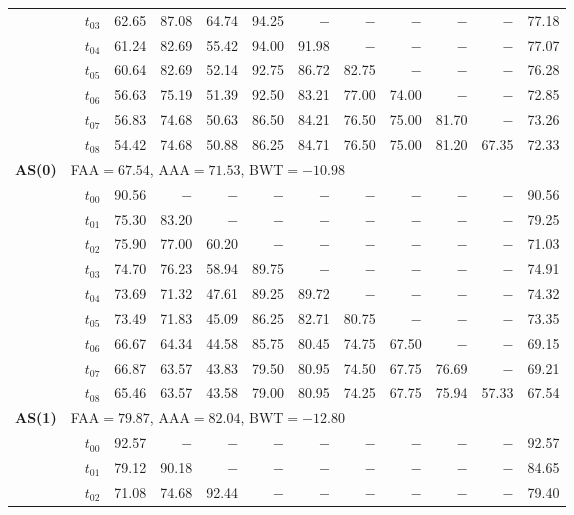 \begin{table}[ht]
\begin{tabular}{@{}l l l *{10}{r}@{}}
 & & $t_{03}$ & 62.65 & 87.08 & 64.74 & 94.25 & $-$ & $-$ & $-$ & $-$ & $-$ & 77.18 \\
 & & $t_{04}$ & 61.24 & 82.69 & 55.42 & 94.00 & 91.98 & $-$ & $-$ & $-$ & $-$ & 77.07 \\
 & & $t_{05}$ & 60.64 & 82.69 & 52.14 & 92.75 & 86.72 & 82.75 & $-$ & $-$ & $-$ & 76.28 \\
 & & $t_{06}$ & 56.63 & 75.19 & 51.39 & 92.50 & 83.21 & 77.00 & 74.00 & $-$ & $-$ & 72.85 \\
 & & $t_{07}$ & 56.83 & 74.68 & 50.63 & 86.50 & 84.21 & 76.50 & 75.00 & 81.70 & $-$ & 73.26 \\
 & & $t_{08}$ & 54.42 & 74.68 & 50.88 & 86.25 & 84.71 & 76.50 & 75.00 & 81.20 & 67.35 & 72.33 \\
\midrule
\multirow{10}{*}{\textbf{AS(0)}} & \multicolumn{11}{l}{\quad\small FAA$=67.54$,\; AAA$=71.53$,\; BWT$=-10.98$} \\
 & & $t_{00}$ & 90.56 & $-$ & $-$ & $-$ & $-$ & $-$ & $-$ & $-$ & $-$ & 90.56 \\
 & & $t_{01}$ & 75.30 & 83.20 & $-$ & $-$ & $-$ & $-$ & $-$ & $-$ & $-$ & 79.25 \\
 & & $t_{02}$ & 75.90 & 77.00 & 60.20 & $-$ & $-$ & $-$ & $-$ & $-$ & $-$ & 71.03 \\
 & & $t_{03}$ & 74.70 & 76.23 & 58.94 & 89.75 & $-$ & $-$ & $-$ & $-$ & $-$ & 74.91 \\
 & & $t_{04}$ & 73.69 & 71.32 & 47.61 & 89.25 & 89.72 & $-$ & $-$ & $-$ & $-$ & 74.32 \\
 & & $t_{05}$ & 73.49 & 71.83 & 45.09 & 86.25 & 82.71 & 80.75 & $-$ & $-$ & $-$ & 73.35 \\
 & & $t_{06}$ & 66.67 & 64.34 & 44.58 & 85.75 & 80.45 & 74.75 & 67.50 & $-$ & $-$ & 69.15 \\
 & & $t_{07}$ & 66.87 & 63.57 & 43.83 & 79.50 & 80.95 & 74.50 & 67.75 & 76.69 & $-$ & 69.21 \\
 & & $t_{08}$ & 65.46 & 63.57 & 43.58 & 79.00 & 80.95 & 74.25 & 67.75 & 75.94 & 57.33 & 67.54 \\
\midrule
\multirow{10}{*}{\textbf{AS(1)}} & \multicolumn{11}{l}{\quad\small FAA$=79.87$,\; AAA$=82.04$,\; BWT$=-12.80$} \\
 & & $t_{00}$ & 92.57 & $-$ & $-$ & $-$ & $-$ & $-$ & $-$ & $-$ & $-$ & 92.57 \\
 & & $t_{01}$ & 79.12 & 90.18 & $-$ & $-$ & $-$ & $-$ & $-$ & $-$ & $-$ & 84.65 \\
 & & $t_{02}$ & 71.08 & 74.68 & 92.44 & $-$ & $-$ & $-$ & $-$ & $-$ & $-$ & 79.40 \\

\end{tabular}
\end{table}
